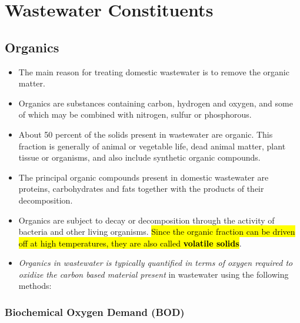 \documentclass{article}
\begin{document}
\newpage
\section{Wastewater Constituents}
	\subsection{Organics}
		\begin{itemize}
			\item The main reason for treating domestic wastewater is to remove the organic matter.  
			\item Organics are substances containing carbon, hydrogen and oxygen, and some of which may be combined with nitrogen, sulfur or phosphorous.
			\item About 50 percent of the solids present in wastewater are organic.  This fraction is generally of animal or vegetable life, dead animal matter, plant tissue or organisms, and also include synthetic organic compounds.
			\item The principal organic compounds present in domestic wastewater are proteins, carbohydrates and fats together with the products of their decomposition.
			\item Organics are subject to decay or decomposition through the activity of bacteria and other living organisms.  \hl{Since the organic fraction can be driven off at high temperatures, they are also called \textbf{volatile solids}}.\
			\item \emph{Organics in wastewater is typically quantified in terms of oxygen required to oxidize the carbon based material present} in wastewater using the following methods:\\
		\end{itemize}
\subsubsection{Biochemical Oxygen Demand (BOD)}
\end{document}
